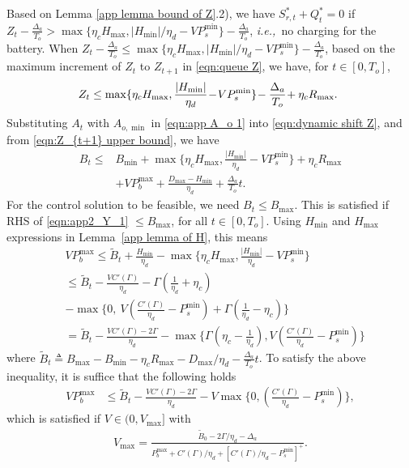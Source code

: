 \documentclass[journal]{IEEEtran}
\def\ie{{\it i.e.,\ \/}}
\def\nn{\nonumber}
\begin{document}
Based on Lemma \ref{app lemma bound of Z}.2), we have $S^*_{r,t}+Q^*_t=0$ if  $Z_t-\frac{\Delta_a}{T_o}>\max\{\eta_cH_{\max},|H_{\min}|/\eta_d-VP_{s}^{\min}\}-\frac{\Delta_a}{T_o}$, \ie no charging for the battery.
When $Z_t-\frac{\Delta_a}{T_o}\leq \max\{\eta_cH_{\max},|H_{\min}|/\eta_d-VP_{s}^{\min}\}-\frac{\Delta_a}{T_o}$, based on the maximum increment of $Z_t$ to $Z_{t+1}$ in \eqref{eqn:queue Z}, we have, for $t\in[0,T_o]$,
\begin{align}\label{eqn:Z_{t+1} upper bound}
\hspace*{-.5em}Z_t\leq \max\{\eta_cH_{\max},\frac{|H_{\min}|}{\eta_d}\!-\!VP_{s}^{\min}\}\!-\frac{\Delta_a}{T_o}\!+\eta_c R_{\max}.
\end{align}
Substituting $A_t$ with  $A_{o,\min}$ in \eqref{eqn:app A_o 1} into \eqref{eqn:dynamic shift Z}, and from \eqref{eqn:Z_{t+1} upper bound}, we have
\begin{align}\label{eqn:app2_Y_1}
B_t\leq& B_{\min}+\max\{\eta_cH_{\max},\frac{|H_{\min}|}{\eta_d}\!-VP_{s}^{\min}\}+\eta_cR_{\max}\nn\\
&+VP_{b}^{\max}+\frac{D_{\max}\!-\!H_{\min}}{\eta_d}+\frac{\Delta_a}{T_o}t.
\end{align}
For the control solution to be feasible, we need $B_t\le B_{\max}$. This is satisfied if RHS of \eqref{eqn:app2_Y_1} $\le B_{\max}$, for all $t\in [0,T_o]$. Using $H_{\min}$ and $H_{\max}$ expressions in  Lemma~\ref{app lemma of H}, this means
\begin{align*}
&VP_b^{\max} \le \tilde{B}_t+\frac{H_{\min}}{\eta_d}-\max\{\eta_cH_{\max},\frac{|H_{\min}|}{\eta_d}-VP_{s}^{\min}\} \nn \\
&\le \tilde{B}_t-\frac{VC'(\Gamma)}{\eta_d}-\Gamma(\frac{1}{\eta_d}+\eta_c)\nn \\
&-\max\{0,\ V(\frac{C'(\Gamma)}{\eta_d}-P_{s}^{\min})+\Gamma(\frac{1}{\eta_d}-\eta_c)\} \nn \\
&=\!  \tilde{B}_t\!-\!\frac{VC'(\Gamma)\!-\!2\Gamma }{\eta_d}\!-\!\max\{\Gamma(\eta_c\!-\!\frac{1}{\eta_d}),  V(\frac{C'(\Gamma)}{\eta_d}\!-\!P_{s}^{\min})\}
\end{align*}
where $\tilde{B}_t\triangleq \! B_{\max}\!-B_{\min}\!-\eta_cR_{\max}\!-D_{\max}/\eta_d-\frac{\Delta_a}{T_o}t$.
To satisfy the above inequality, it is suffice that the following holds
\begin{align*}
VP_b^{\max} &\le\tilde{B}_t-\frac{VC'(\Gamma)-2\Gamma }{\eta_d}-V\max\{0,  (\frac{C'(\Gamma)}{\eta_d}-P_{s}^{\min})\},
\end{align*}
which is satisfied if $V\in (0,V_{\max}]$ with
\begin{align}\label{eqn:Vmax for delta_a>0}
V_{\max}=\frac{\tilde{B}_0-2\Gamma/\eta_d-\Delta_a}{P_{b}^{\max}+C'(\Gamma)/\eta_d+[C'(\Gamma)/\eta_d-P_{s}^{\min}]^+}.
\end{align}
\end{document}
